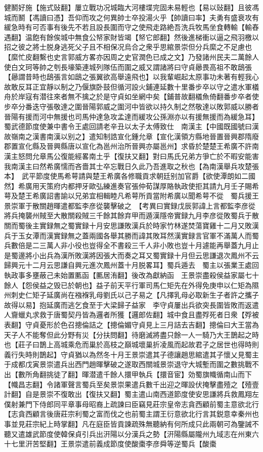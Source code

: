 健鬭好施【施式䜴翻】屢立戰功况城臨大河樓堞完固未易輕也【易以䜴翻】且彼馮城而鬭【馮讀曰憑】吾仰而攻之何異帥士卒投湯火乎【帥讀曰率】夫勇有盛衰攻有緩急時有可否事有後先不若且設長圍而守之使飛走路絶吾洗兵牧馬坐食轉輸【輸舂遇翻】温飽有餘俟城中無食公帑家財皆竭【帑它郎翻】然後進梯衝以逼之飛羽檄以招之彼之將士脱身逃死父子且不相保况烏合之衆乎思綰景崇但分兵縻之不足慮也【縻忙皮翻繫也史言郭威方畧亦因周之史官潤色已成之文】乃發諸州民夫二萬餘人使白文珂等帥之刳長壕築連城列隊伍而圍之威又謂諸將曰守貞曏畏高祖不敢鴟張【曏謂昔時也鴟張言如鴟之張翼欲高舉遠飛也】以我輩崛起太原事功未著有輕我心故敢反耳正宜靜以制之乃偃旗卧鼓但循河設火鋪連延數十里番步卒以守之遣水軍檥舟於岸寇有潜往來者無不擒之於是守貞如坐網中矣【鋪普故翻檥魚倚翻番步卒者使步卒分番迭守張敬達之圍晉陽郭威之圍河中皆欲以持久制之然敬達以敗郭威以勝者晉陽有援而河中無援也司馬仲達急攻孟達而緩攻公孫淵亦以有援無援而為緩急耳】　蜀武德節度使兼中書令王處回請老辛丑以太子太傅致仕　南漢主【中國既國號曰漢故嶺南之漢書南漢以别之】遣知制誥宣化鍾允章【宣化漢領方縣地晉置晉興郡隋廢郡置宣化縣及晉興縣唐以宣化為邕州治所晉興亦屬邕州】求昏於楚楚王希廣不許南漢主怒問允章馬公復能經畧南土乎【復扶又翻】對曰馬氏兄弟方爭亡於不暇安能害我南漢主曰然希廣懦而吝嗇其士卒忘戰日久此乃吾進取之秋也【為南漢舉兵攻楚張本】　武平節度使馬希萼請與楚王希廣各修職貢求朝廷别加官爵【欲使潭朗如二國然】希廣用天策府内都押牙歐弘練進奏官張仲荀謀厚賂執政使拒其請九月壬子賜希萼及楚王希廣詔書諭以兄弟宜相輯睦凡希萼所貢當附希廣以聞希萼不從　蜀兵援王景崇軍于散關趙暉遣都監李彦從襲擊破之　【考異曰實録戊辰郭諱上言都監李彦從將兵掩襲州賊至大散關殺賊三千餘其餘弃甲而遁漢隱帝實録九月李彦從敗蜀兵于散關而蜀後主實録無之蜀實録十月安思謙敗漢兵於時家竹林遂焚蕩寶雞十二月又敗漢兵于玉女潭而漢實録無之蓋兩國各舉其勝而諱其敗耳然漢實録言官軍不滿萬人而蜀兵數倍是二三萬人非小役也豈得全不書殺三千人非小敗也豈十月遽能再舉蓋九月止是蜀邊將小出兵為漢所敗漢將因張大而奏之耳又蜀實録十月但云思謙退次鳳州不云歸興元十二月云思謙自興元進次鳳州蓋十月脱畧耳】蜀兵遁去　蜀主以張業王處回執政事多壅蔽己未始置匭函【匭居洧翻】後改為獻納函　王景崇盡殺侯益家屬七十餘人【怨侯益之毁已於朝也】益子前天平行軍司馬仁矩先在外得免庚申以仁矩為隰州刺史仁矩子延廣尚在襁褓乳母劉氏以己子易之【凡擇乳母必取新生子者許之攜子故得以易】抱延廣而逃乞食至于大梁歸子益家　李守貞屢出兵欲突長圍皆敗而返遣人齎蠟丸求救于唐蜀契丹皆為邏者所獲【邏郎佐翻】城中食且盡殍死者日衆【殍被表翻】守貞憂形於色召摠倫詰之【摠倫媚守貞見上三月詰去吉翻】摠倫曰大王當為天子人不能奪但此分野有災【分扶問翻】待磨滅將盡只餘一人一騎乃大王鵲起之時也【莊子曰鵲上高城乘危而巢於高枝之巔城壞巢折凌風而起故君子之居世也得時則義行失時則鵲起】守貞猶以為然冬十月王景崇遣其子德讓趙思綰遣其子懷乂見蜀主于成都戊寅景崇遣兵出西門趙暉擊破之遂取西關城景崇退守大城塹而圍之數挑戰不出【數所角翻挑徒了翻】暉潜遣千餘人擐甲執兵【擐音宦】効蜀旗幟循南山而下【幟昌志翻】令諸軍聲言蜀兵至矣景崇果遣兵數千出迎之暉設伏掩擊盡殪之【殪壹計翻】自是景崇不復敢出【復扶又翻】蜀主遣山南西道節度使安思謙將兵救鳳翔左僕射兼門下侍郎同平章事母昭裔上疏諫曰臣竊見莊宗皇帝志貪西顧前蜀主意欲北行【志貪西顧言後唐莊宗利蜀之富而伐之也前蜀主謂王衍意欲北行言其鋭意幸秦州也事並見莊宗紀上時掌翻】凡在庭臣皆貢諫疏殊無聽納有何所成只此兩朝可為鑒誡不聽又遣雄武節度使韓保貞引兵出汧陽以分漢兵之勢【汧陽縣屬隴州九域志在州東六十七里汧苦堅翻】王景崇遣前義成節度使酸棗李彦舜等逆蜀兵【酸棗
